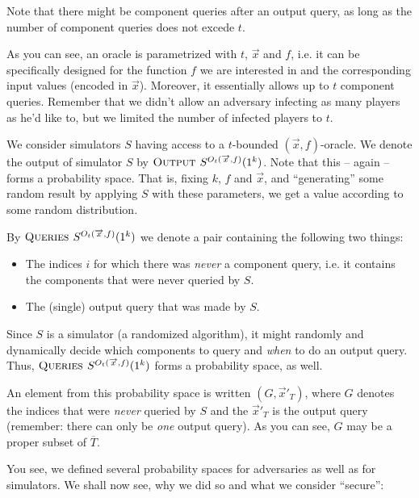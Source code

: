 \message{ !name(seminar.tex)}\documentclass{llncs}
\begin{document}
Note that there might be component queries after an output query, as long as the number of component queries does not excede $t$.

As you can see, an oracle is parametrized with $t$, $\overrightarrow{x}$ and $f$, i.e. it can be  specifically designed for the function $f$ we are interested in and the corresponding input values (encoded in $\overrightarrow{x}$). Moreover, it essentially allows up to $t$ component queries. Remember that we didn't allow an adversary infecting as many players as he'd like to, but we limited the number of infected players to $t$.

We consider simulators $S$ having access to a $t$-bounded $(\overrightarrow{x},f)$-oracle. We denote the output of simulator $S$ by $\textsc{Output } S^{O_t(\overrightarrow{x},f)}(1^k)$. Note that this -- again -- forms a probability space. That is, fixing $k$, $f$ and $\overrightarrow{x}$, and ``generating'' some random result by applying $S$ with these parameters, we get a value according to some random distribution.

By $\textsc{Queries } S^{O_t(\overrightarrow{x},f)}(1^k)$ we denote a pair containing the following two things:

\begin{itemize}
\item The indices $i$ for which there was \emph{never} a component query, i.e. it contains the components that were never queried by $S$.
\item The (single) output query that was made by $S$.
\end{itemize}

Since $S$ is a simulator (a randomized algorithm), it might randomly and dynamically decide which components to query and \emph{when} to do an output query. Thus, $\textsc{Queries } S^{O_t(\overrightarrow{x},f)}(1^k)$ forms a probability space, as well. 

An element from this probability space is written $(G,\overrightarrow{x}'_{T})$, where $G$ denotes the indices that were \emph{never} queried by $S$ and the $\overrightarrow{x}'_{T}$ is the output query (remember: there can only be \emph{one} output query). As you can see, $G$ may be a proper subset of $\overline{T}$.

You see, we defined several probability spaces for adversaries as well as for simulators. We shall now see, why we did so and what we consider ``secure'':
\end{document}
